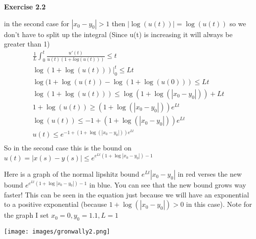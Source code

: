 \documentclass[12pt]{article}
\newenvironment{exercise}[1]{\vspace{.1in}\noindent\textbf{Exercise #1 \hspace{.05em}}}{}
\begin{document}
\begin{exercise}{2.2}


	in the second case for $|x_0-y_0|>1$ then $|\log(u(t))|=\log(u(t))$ so we don't have to split up the integral (Since u(t) is increasing it will always be greater than 1)
	\begin{align}
		\frac{1}{L}\int_{0}^{t}\frac{u'(t)}{u(t)(1+log(u(t)))}\leq t \\
		\log(1+\log(u(t)))|_{0}^{t}\leq Lt                           \\
		\log(1+\log(u(t))-\log(1+\log(u(0)))\leq Lt                  \\
		\log(1+\log(u(t)))\leq \log(1+\log(|x_0-y_0|))+Lt            \\
		1+\log(u(t))\geq (1+\log(|x_0-y_0|))e^{Lt}                   \\
		\log(u(t))\leq -1+(1+\log(|x_0-y_0|))e^{Lt}                  \\
		u(t)\leq e^{-1+(1+\log(|x_0-y_0|))e^{Lt}}                    \\
	\end{align}
	So in the second case this is the bound on $u(t)=|x(s)-y(s)|\leq e^{e^{Lt}(1+\log|x_0-y_0|)-1} $

	Here is a graph of the normal lipshitz bound $e^{Lt}|x_0-y_0|$ in red verses the new bound $e^{e^{Lt}(1+\log|x_0-y_0|)-1} $ in blue. You can see that the new bound grows way faster! This can be seen in the equation just because we will have an exponential to a positive exponential (because $1+\log(|x_0-y_0|)>0$ in this case). Note for the graph I set $x_0=0,y_0=1.1,L=1$

	\texttt{[image: images/gronwally2.png]}
\end{exercise} 
\end{document}
